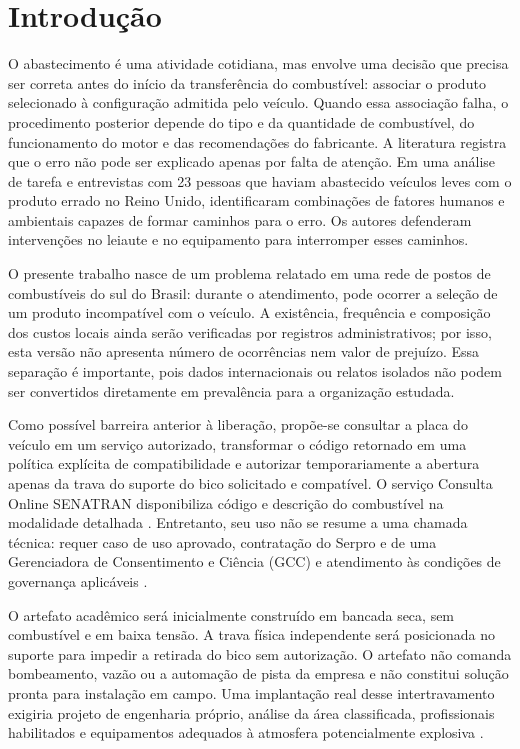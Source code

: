 \section{Introdução}
\label{sec:introducao}

O abastecimento é uma atividade cotidiana, mas envolve uma decisão que precisa
ser correta antes do início da transferência do combustível: associar o produto
selecionado à configuração admitida pelo veículo. Quando essa associação falha,
o procedimento posterior depende do tipo e da quantidade de combustível, do
funcionamento do motor e das recomendações do fabricante. A literatura registra
que o erro não pode ser explicado apenas por falta de atenção. Em uma análise
de tarefa e entrevistas com 23 pessoas que haviam abastecido veículos leves com
o produto errado no Reino Unido, \cite{adamsDavid2007} identificaram combinações
de fatores humanos e ambientais capazes de formar caminhos para o erro. Os
autores defenderam intervenções no leiaute e no equipamento para interromper
esses caminhos.

O presente trabalho nasce de um problema relatado em uma rede de postos de
combustíveis do sul do Brasil: durante o atendimento, pode ocorrer a seleção de
um produto incompatível com o veículo. A existência, frequência e composição
dos custos locais ainda serão verificadas por registros administrativos; por
isso, esta versão não apresenta número de ocorrências nem valor de prejuízo.
Essa separação é importante, pois dados internacionais ou relatos isolados não
podem ser convertidos diretamente em prevalência para a organização estudada.

Como possível barreira anterior à liberação, propõe-se consultar a placa do
veículo em um serviço autorizado, transformar o código retornado em uma política
explícita de compatibilidade e autorizar temporariamente a abertura apenas da
trava do suporte do bico solicitado e compatível. O serviço Consulta Online
SENATRAN disponibiliza código e descrição
do combustível na modalidade detalhada \cite{serproDadosVeiculo2026}. Entretanto,
seu uso não se resume a uma chamada técnica: requer caso de uso aprovado,
contratação do Serpro e de uma Gerenciadora de Consentimento e Ciência (GCC) e
atendimento às condições de governança aplicáveis \cite{senatran1392025,serproComoContratar2026}.

O artefato acadêmico será inicialmente construído em bancada seca, sem
combustível e em baixa tensão. A trava física independente será posicionada no
suporte para impedir a retirada do bico sem autorização. O artefato não comanda
bombeamento, vazão ou a automação de pista da empresa e não constitui solução
pronta para instalação em campo. Uma implantação real desse intertravamento
exigiria projeto de engenharia próprio, análise da área classificada,
profissionais habilitados e equipamentos adequados à atmosfera potencialmente
explosiva \cite{inmetro1152022,nr20}.

